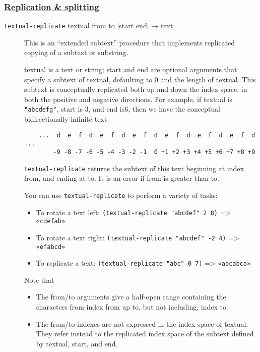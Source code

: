 \subsubsection{\texorpdfstring{\href{}{Replication \&
splitting}}{Replication \& splitting}}\label{replication-splitting}

\begin{description}
\item[ \href{}{} \texttt{textual-replicate} textual from to {[}start
end{]} → text ]
This is an ``extended subtext'' procedure that implements replicated
copying of a subtext or substring.

textual is a text or string; start and end are optional arguments that
specify a subtext of textual, defaulting to 0 and the length of textual.
This subtext is conceptually replicated both up and down the index
space, in both the positive and negative directions. For example, if
textual is \texttt{"abcdefg"}, start is 3, and end is6, then we have the
conceptual bidirectionally-infinite text

\begin{verbatim}
    ...  d  e  f  d  e  f  d  e  f  d  e  f  d  e  f  d  e  f  d ...
        -9 -8 -7 -6 -5 -4 -3 -2 -1  0 +1 +2 +3 +4 +5 +6 +7 +8 +9
\end{verbatim}

\texttt{textual-replicate} returns the subtext of this text beginning at
index from, and ending at to. It is an error if from is greater than to.

You can use \texttt{textual-replicate} to perform a variety of tasks:

\begin{itemize}
\tightlist
\item
  To rotate a text left: \texttt{(textual-replicate\ "abcdef"\ 2\ 8)}
  =\textgreater{} \texttt{«cdefab»}
\item
  To rotate a text right: \texttt{(textual-replicate\ "abcdef"\ -2\ 4)}
  =\textgreater{} \texttt{«efabcd»}
\item
  To replicate a text: \texttt{(textual-replicate\ "abc"\ 0\ 7)}
  =\textgreater{} \texttt{«abcabca»}
\end{itemize}

Note that

\begin{itemize}
\tightlist
\item
  The from/to arguments give a half-open range containing the characters
  from index from up to, but not including, index to.
\item
  The from/to indexes are not expressed in the index space of textual.
  They refer instead to the replicated index space of the subtext
  defined by textual, start, and end.
\end{itemize}


\end{description}
